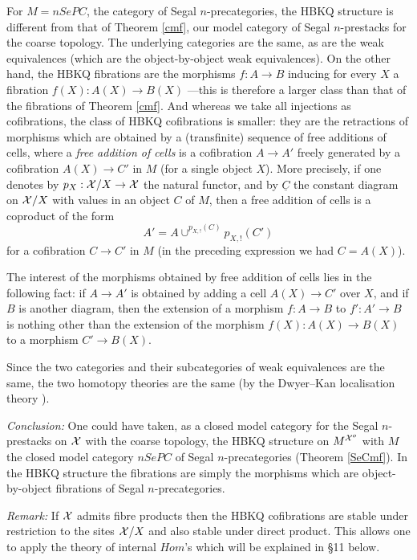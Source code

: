 For $M=nSePC$, the category of Segal $n$-precategories, the HBKQ structure is
different from that of Theorem \ref{cmf}, our model category of Segal
$n$-prestacks for the coarse topology. The underlying categories are the
same, as are the weak equivalences (which are the object-by-object weak
equivalences). On the other hand, the HBKQ fibrations are the morphisms
$f:A\rightarrow B$ inducing for every $X$ a fibration
$f(X): A(X)\rightarrow B(X)$ ---this is therefore a larger class than that of
the fibrations of Theorem \ref{cmf}. And whereas we take all injections as
cofibrations, the class of HBKQ cofibrations is smaller: they are the
retractions of morphisms which are obtained by a (transfinite) sequence of
free additions of cells, where a \emph{free addition of cells} is a
cofibration $A\rightarrow A'$ freely generated by a cofibration
$A(X)\rightarrow C'$ in $M$ (for a single object $X$). More precisely, if one
denotes by $p_X: {\cal X} /X\rightarrow {\cal X}$ the natural functor, and by
$\underline{C}$ the constant diagram on ${\cal X} /X$ with values in an object $C$
of $M$, then a free addition of cells is a coproduct of the form
$$
A' = A \cup ^{p_{X,!}(C)}p_{X,!}(C')
$$
for a cofibration $C\rightarrow C'$ in $M$ (in the preceding expression we
had $C=A(X)$).

The interest of the morphisms obtained by free addition of cells lies in the
following fact: if $A\rightarrow A'$ is obtained by adding a cell
$A(X)\rightarrow C'$ over $X$, and if $B$ is another diagram, then the
extension of a morphism $f:A\rightarrow B$ to $f':A'\rightarrow B$ is nothing
other than the extension of the morphism $f(X): A(X)\rightarrow B(X)$ to a
morphism $C'\rightarrow B(X)$.

Since the two categories and their subcategories of weak equivalences are the
same, the two homotopy theories are the same (by the Dwyer--Kan localisation
theory \cite{DwyerKan1} \cite{DwyerKan2} \cite{DwyerKan3}).

{\em Conclusion:} One could have taken, as a closed model category for the
Segal $n$-prestacks on ${\cal X}$ with the coarse topology, the HBKQ structure on
$M^{{\cal X} ^o}$ with $M$ the closed model category $nSePC$ of Segal
$n$-precategories (Theorem \ref{SeCmf}). In the HBKQ structure the fibrations
are simply the morphisms which are object-by-object fibrations of Segal
$n$-precategories.

{\em Remark:} If ${\cal X}$ admits fibre products then the HBKQ cofibrations are
stable under restriction to the sites ${\cal X} /X$ and also stable under direct
product. This allows one to apply the theory of internal $Hom$'s which will
be explained in \S11 below.


